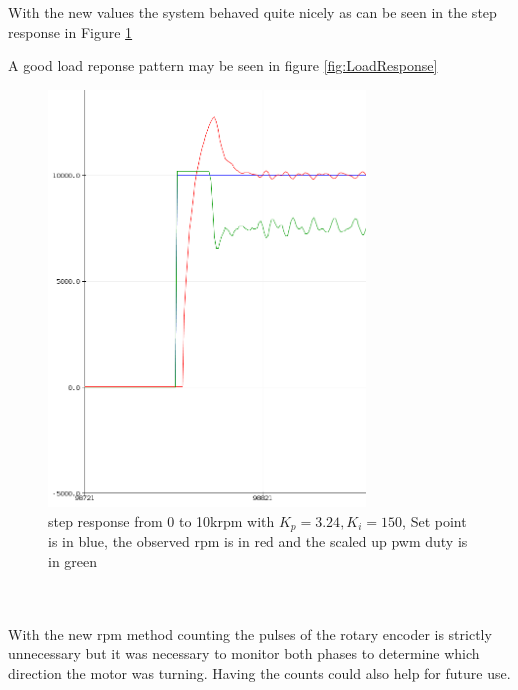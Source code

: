 \documentclass{article}
\begin{document}
With the new values the system behaved quite nicely as can be seen in the step response in Figure \ref{fig:stepResponse}

A good load reponse pattern may be seen in figure \ref{fig:LoadResponse}


\begin{figure}[H]
    \centering
    \includegraphics[width=0.75\textwidth]{Project3ControllerStateMachine/Step_p324_i120.png}
    \caption{step response from 0 to 10krpm with  \(K_p = 3.24, K_i=150\), Set point is in blue, the observed rpm is in red and the scaled up pwm duty is in green}
    \label{fig:stepResponse}
\end{figure}

\\
\\
With the new rpm method counting the pulses of the rotary encoder is strictly unnecessary but it was necessary to monitor both phases to determine which direction the motor was turning. Having the counts could also help for future use. 
\end{document}
